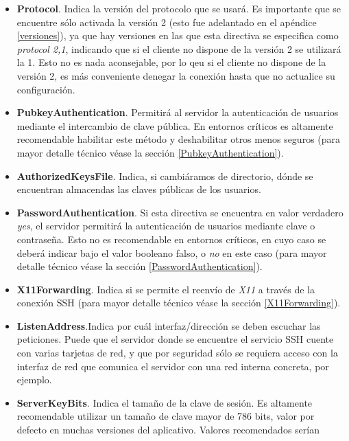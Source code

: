 \documentclass[a4paper, 11pt, titlepage]{article}
\begin{document}
\begin{itemize}
            \item \textbf{Protocol}. Indica la versión del protocolo que se usará. Es importante que se encuentre sólo activada 
            la versión 2 (esto fue adelantado en el apéndice \ref{versiones}), ya que hay versiones en las que esta directiva se 
            especifica como \textit{protocol 2,1}, indicando que si el cliente no dispone de la versión 2 se utilizará la 1. 
            Esto no es nada aconsejable, por lo qeu si el cliente no dispone de la versión 2, es más conveniente denegar la 
            conexión hasta que no actualice su configuración.
            \item \textbf{PubkeyAuthentication}. Permitirá al servidor la autenticación de usuarios mediante el intercambio 
            de clave pública. En entornos críticos es altamente recomendable habilitar este método y deshabilitar otros menos
            seguros (para mayor detalle técnico véase la sección \ref{PubkeyAuthentication}).
            \item \textbf{AuthorizedKeysFile}. Indica, si cambiáramos de directorio, dónde se encuentran almacendas 
            las claves públicas de los usuarios.
            \item \textbf{PasswordAuthentication}. Si esta directiva se encuentra en valor verdadero \textit{yes}, el servidor 
            permitirá la autenticación de usuarios mediante clave o contraseña. Esto no es recomendable en entornos críticos, en cuyo 
            caso se deberá indicar bajo el valor booleano falso, o \textit{no} en este caso (para mayor detalle técnico véase la sección
            \ref{PasswordAuthentication}).
            \item \textbf{X11Forwarding}. Indica si se permite el reenvío de \textit{X11} a través de la conexión SSH (para mayor 
            detalle técnico véase la sección \ref{X11Forwarding}).
            \item \textbf{ListenAddress}.Indica por cuál interfaz/dirección se deben escuchar las peticiones. Puede que el 
            servidor donde se encuentre el servicio SSH cuente con varias tarjetas de red, y que por seguridad sólo se requiera acceso 
            con la interfaz de red que comunica el servidor con una red interna concreta, por ejemplo.
            \item \textbf{ServerKeyBits}. Indica el tamaño de la clave de sesión. Es altamente recomendable utilizar un tamaño de 
            clave mayor de 786 bits, valor por defecto en muchas versiones del aplicativo. Valores recomendados serían 

\end{itemize}
\end{document}
